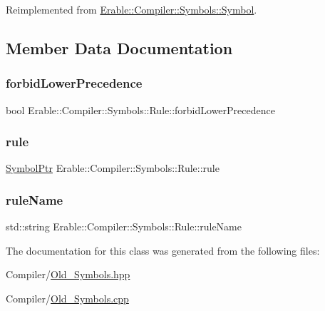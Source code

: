 Reimplemented from \mbox{\hyperlink{class_erable_1_1_compiler_1_1_symbols_1_1_symbol_af5ccb3fb3201fd88ab6ce0e495416c82}{Erable\+::\+Compiler\+::\+Symbols\+::\+Symbol}}.



\subsection{Member Data Documentation}
\mbox{\label{class_erable_1_1_compiler_1_1_symbols_1_1_rule_a040b3ef6b4d88220130b8a8a0de2b299}} 
\subsubsection{\texorpdfstring{forbidLowerPrecedence}{forbidLowerPrecedence}}
{\footnotesize\ttfamily bool Erable\+::\+Compiler\+::\+Symbols\+::\+Rule\+::forbid\+Lower\+Precedence}

\mbox{\label{class_erable_1_1_compiler_1_1_symbols_1_1_rule_a12427a19c09e0286bb2b59cc78bd7fd5}} 
\subsubsection{\texorpdfstring{rule}{rule}}
{\footnotesize\ttfamily \mbox{\hyperlink{namespace_erable_1_1_compiler_1_1_symbols_a8f0bc762f448ea4d84e8713ab3e140b9}{Symbol\+Ptr}} Erable\+::\+Compiler\+::\+Symbols\+::\+Rule\+::rule}

\mbox{\label{class_erable_1_1_compiler_1_1_symbols_1_1_rule_a099515287a10e4fd5412612d852ae2ca}} 
\subsubsection{\texorpdfstring{ruleName}{ruleName}}
{\footnotesize\ttfamily std\+::string Erable\+::\+Compiler\+::\+Symbols\+::\+Rule\+::rule\+Name}



The documentation for this class was generated from the following files\+:\begin{DoxyCompactItemize}
\item 
Compiler/\mbox{\hyperlink{_old___symbols_8hpp}{Old\+\_\+\+Symbols.\+hpp}}\item 
Compiler/\mbox{\hyperlink{_old___symbols_8cpp}{Old\+\_\+\+Symbols.\+cpp}}\end{DoxyCompactItemize}
